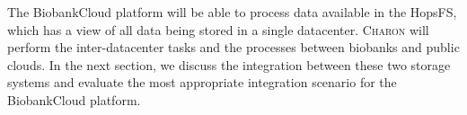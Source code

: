 The BiobankCloud platform will be able to process data available in the HopsFS, which has a view of all data being stored in a single datacenter.
\textsc{Charon} will perform the inter-datacenter tasks and the processes between biobanks and public clouds.
In the next section, we discuss the integration between these two storage systems and evaluate the most appropriate integration scenario for the BiobankCloud platform.

